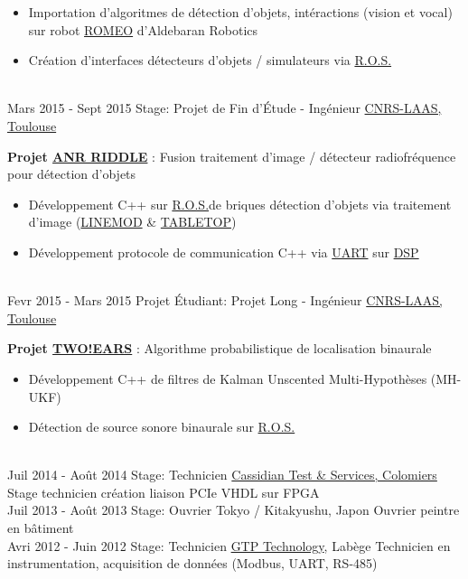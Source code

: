 \documentclass[letterpaper]{twentysecondcv} %
\newcommand{\ros}{\href{http://www.ros.org/}{R.O.S.}}
\begin{document}
\begin{twenty}
{    \begin{itemize}
    \item Importation d'algoritmes de détection d'objets, intéractions (vision
      et vocal) sur robot
      \href{https://spectrum.ieee.org/automaton/robotics/humanoids/aldebaran-robotics-introduces-romeo-finally}{ROMEO}
      d'Aldebaran Robotics
    \item Création d'interfaces détecteurs d'objets / simulateurs via \ros
    \end{itemize}
  }
  \\
  \twentyitem
  {Mars 2015 -}
  {Sept 2015}
  {Stage: Projet de Fin d'Étude - Ingénieur}
  {\href{https://www.laas.fr/public/fr}{CNRS-LAAS, Toulouse}}
  {}
  {
    \textbf{Projet
      \href{http://www.agence-nationale-recherche.fr/Project-ANR-12-CORD-0003}{ANR
        RIDDLE}} : Fusion traitement d'image / détecteur radiofréquence pour
    détection d'objets
    \begin{itemize}
    \item Développement C++ sur \ros de briques
      détection d'objets via traitement d'image
      (\href{http://www.stefan-hinterstoisser.com/papers/hinterstoisser2011linemod.pdf}{LINEMOD}
      \& \href{http://wiki.ros.org/tabletop_object_detector}{TABLETOP})
    \item Développement protocole de communication C++ via
      \href{https://en.wikipedia.org/wiki/Universal_asynchronous_receiver-transmitter}{UART}
      sur \href{https://en.wikipedia.org/wiki/Digital_signal_processor}{DSP}
    \end{itemize}
  }
  \\
  \twentyitem
  {Fevr 2015 -}
  {Mars 2015}
  {Projet Étudiant: Projet Long - Ingénieur}
  {\href{https://www.laas.fr/public/fr}{CNRS-LAAS, Toulouse}}
  {}
  {
    \textbf{Projet
      \href{http://twoears.eu/}{TWO!EARS}} : Algorithme probabilistique de
    localisation binaurale
    \begin{itemize}
    \item Développement C++ de filtres de Kalman Unscented Multi-Hypothèses
      (MH-UKF)
    \item Détection de source sonore binaurale sur \ros
    \end{itemize}
  }
  \\
  \twentyitem
  {Juil 2014 -}
  {Août 2014}
  {Stage: Technicien}
  {\href{http://www.spherea.com/fr}{Cassidian Test \& Services, Colomiers}}
  {}
  {
    Stage technicien création liaison PCIe VHDL sur FPGA
  }
  \\
  \twentyitem
  {Juil 2013 -}
  {Août 2013}
  {Stage: Ouvrier}
  {Tokyo / Kitakyushu, Japon}
  {}
  {
    Ouvrier peintre en bâtiment
  }
  \\
  \twentyitem
  {Avri 2012 -}
  {Juin 2012}
  {Stage: Technicien}
  {\href{https://www.gtptech.com/}{GTP Technology}, Labège}
  {}
  {
    Technicien en instrumentation, acquisition de données (Modbus, UART, RS-485)
  }  
\end{twenty}
\end{document}
